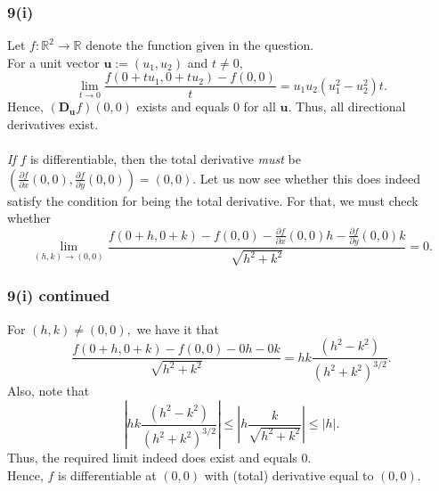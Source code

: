 \documentclass[handout]{beamer}
\begin{document}
\begin{frame}
	\frametitle{9(i)}
    Let $f:\mathbb{R}^2 \to \mathbb{R}$ denote the function given in the question.\\
	For a unit vector $\textbf{u} := (u_1, u_2)$ and $t \neq 0,$
	\[\lim_{t \to 0} \frac{f\left(0+t u_{1}, 0+t u_{2}\right)-f(0,0)}{t} = u_1u_2(u_1^2 - u_2^2)t.\]
	Hence, $\left(\mathbf{D_u} f\right)(0,0)$ exists and equals $0$ for all $\textbf{u}.$ Thus, all directional derivatives exist.\\~\\
	\emph{If} $f$ is differentiable, then the total derivative \emph{must} be $(\frac{\partial f}{\partial x}(0, 0), \frac{\partial f}{\partial y}(0, 0)) = (0, 0).$ Let us now see whether this does indeed satisfy the condition for being the total derivative. For that, we must check whether
	\[\lim _{(h, k) \rightarrow(0,0)} \frac{f\left(0+h, 0+k\right)-f\left(0, 0\right)-\frac{\partial f}{\partial x}(0,0) h-\frac{\partial f}{\partial y}(0,0) k}{\sqrt{h^{2}+k^{2}}}=0.\]

\end{frame}

\begin{frame}
	\frametitle{9(i) continued}
	For $(h,k) \neq (0,0),$ we have it that
	\[\frac{f\left(0+h, 0+k\right)-f\left(0, 0\right)-0 h-0 k}{\sqrt{h^{2}+k^{2}}} = hk\frac{(h^2 - k^2)}{(h^2 + k^2)^{3/2}}.\]
	Also, note that
	\[\left|hk\frac{(h^2 - k^2)}{(h^2 + k^2)^{3/2}}\right| \le \left|h\frac{k}{\sqrt{h^2 + k^2}}\right| \le |h|.\]
	Thus, the required limit indeed does exist and equals $0.$\\
	Hence, $f$ is differentiable at $(0,0)$ with (total) derivative equal to $(0, 0).$
\end{frame}
\end{document}
